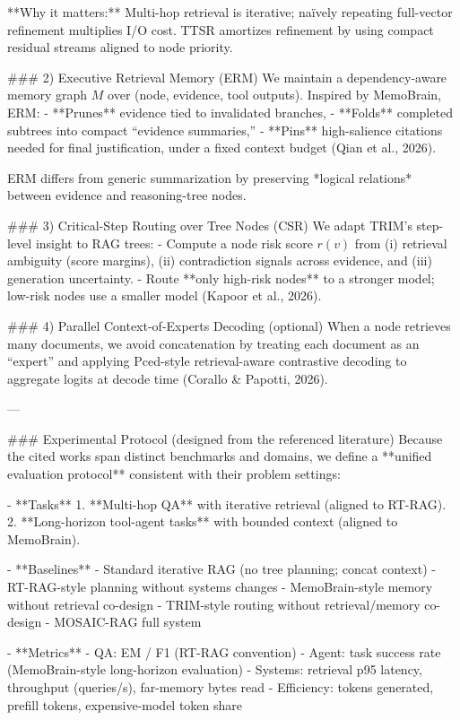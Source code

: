 **Why it matters:** Multi-hop retrieval is iterative; naïvely repeating full-vector refinement multiplies I/O cost. TTSR amortizes refinement by using compact residual streams aligned to node priority.

### 2) Executive Retrieval Memory (ERM)  
We maintain a dependency-aware memory graph \(M\) over (node, evidence, tool outputs). Inspired by MemoBrain, ERM:  
- **Prunes** evidence tied to invalidated branches,  
- **Folds** completed subtrees into compact “evidence summaries,”  
- **Pins** high-salience citations needed for final justification,  
under a fixed context budget (Qian et al., 2026).  

ERM differs from generic summarization by preserving *logical relations* between evidence and reasoning-tree nodes.

### 3) Critical-Step Routing over Tree Nodes (CSR)  
We adapt TRIM’s step-level insight to RAG trees:  
- Compute a node risk score \(r(v)\) from (i) retrieval ambiguity (score margins), (ii) contradiction signals across evidence, and (iii) generation uncertainty.  
- Route **only high-risk nodes** to a stronger model; low-risk nodes use a smaller model (Kapoor et al., 2026).  

### 4) Parallel Context-of-Experts Decoding (optional)  
When a node retrieves many documents, we avoid concatenation by treating each document as an “expert” and applying Pced-style retrieval-aware contrastive decoding to aggregate logits at decode time (Corallo & Papotti, 2026).  

---

### Experimental Protocol (designed from the referenced literature)  
Because the cited works span distinct benchmarks and domains, we define a **unified evaluation protocol** consistent with their problem settings:

- **Tasks**
  1. **Multi-hop QA** with iterative retrieval (aligned to RT-RAG).  
  2. **Long-horizon tool-agent tasks** with bounded context (aligned to MemoBrain).  

- **Baselines**
  - Standard iterative RAG (no tree planning; concat context)  
  - RT-RAG-style planning without systems changes  
  - MemoBrain-style memory without retrieval co-design  
  - TRIM-style routing without retrieval/memory co-design  
  - MOSAIC-RAG full system  

- **Metrics**
  - QA: EM / F1 (RT-RAG convention)  
  - Agent: task success rate (MemoBrain-style long-horizon evaluation)  
  - Systems: retrieval p95 latency, throughput (queries/s), far-memory bytes read  
  - Efficiency: tokens generated, prefill tokens, expensive-model token share  

